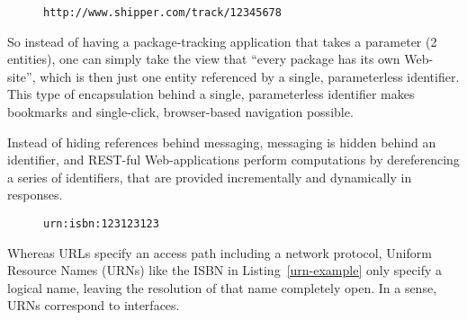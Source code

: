 \documentclass[preprint,authoryear]{acm_proc_article-sp}
\begin{document}

\begin{figure}[htbp]
\begin{lstlisting}[style=L,label=url-example,caption=A Uniform Resource Locator.]
http://www.shipper.com/track/12345678
\end{lstlisting}
\end{figure}

So instead of having
a package-tracking application that takes a parameter (2 entities),
one can simply take the view that ``every package has its own 
Web-site'', which is then just one entity referenced by a single,
parameterless identifier.  This type of encapsulation behind
a single, parameterless identifier makes bookmarks and single-click,
browser-based navigation possible.


Instead of hiding references behind messaging,
messaging is hidden behind an identifier, and REST-ful Web-applications
perform computations by dereferencing a series of identifiers, that 
are provided incrementally and dynamically in responses.


\begin{figure}[htbp]
\begin{lstlisting}[style=L,label=urn-example,caption=A Uniform Resource Name.]
urn:isbn:123123123
\end{lstlisting}
\end{figure}

Whereas URLs specify an access path including a network protocol, Uniform 
Resource Names (URNs) like the ISBN in Listing~\ref{urn-example} only specify a logical
name, leaving the resolution of that name completely open.  In a sense, URNs
correspond to interfaces.
\end{document}
